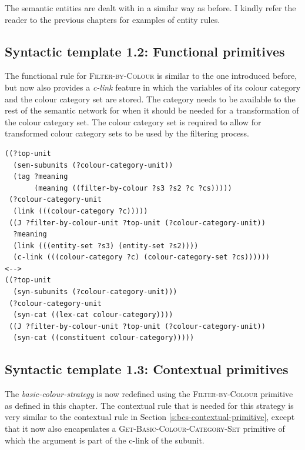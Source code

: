 The semantic entities are dealt with in a similar way as before. I
kindly refer the reader to the previous chapters for examples of
entity rules.

\subsection{Syntactic template 1.2: Functional primitives}

The functional rule for \textsc{Filter-by-Colour} is similar to the
one introduced before, but now also provides a \emph{c-link} feature
in which the variables of its colour category and the colour category
set are stored. The category needs to be available to the rest of the
semantic network for when it should be needed for a transformation of
the colour category set. The colour category set is required to allow
for transformed colour category sets to be used by the filtering
process.

\footnotesize
\begin{Verbatim}[frame=lines, label=Functional rule for Filter-by-Colour]
((?top-unit
  (sem-subunits (?colour-category-unit)) 
  (tag ?meaning
       (meaning ((filter-by-colour ?s3 ?s2 ?c ?cs)))))
 (?colour-category-unit 
  (link (((colour-category ?c)))))
 ((J ?filter-by-colour-unit ?top-unit (?colour-category-unit))
  ?meaning
  (link (((entity-set ?s3) (entity-set ?s2))))
  (c-link (((colour-category ?c) (colour-category-set ?cs))))))
<-->
((?top-unit 
  (syn-subunits (?colour-category-unit)))
 (?colour-category-unit 
  (syn-cat ((lex-cat colour-category))))
 ((J ?filter-by-colour-unit ?top-unit (?colour-category-unit))
  (syn-cat ((constituent colour-category)))))
\end{Verbatim}
\normalsize

\subsection{Syntactic template 1.3: Contextual primitives}

The \emph{basic-colour-strategy} is now redefined 
using the \textsc{Filter-by-Colour} primitive as defined in this
chapter. The contextual rule that is needed for this strategy
is very similar to the contextual rule in Section
\ref{s:bcs-contextual-primitive}, except that it now also encapsulates
a \textsc{Get-Basic-Colour-Category-Set} primitive of which the argument is part of
the c-link of the subunit.

